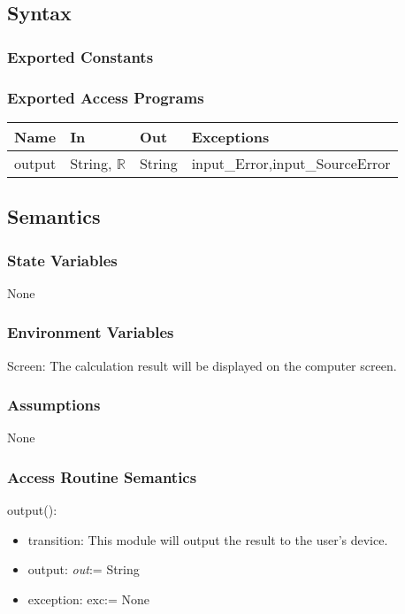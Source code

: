 \documentclass[12pt, titlepage]{article}
\begin{document}
\subsection{Syntax}

\subsubsection{Exported Constants}

\subsubsection{Exported Access Programs}

\begin{center}
\begin{tabular}{p{2cm} p{2cm} p{2cm} p{5cm}}
\hline
\textbf{Name} & \textbf{In} & \textbf{Out} & \textbf{Exceptions} \\
\hline
output & String, $\mathbb{R}$ & String & input\_Error,input\_SourceError\\
\hline
\end{tabular}
\end{center}

\subsection{Semantics}

\subsubsection{State Variables}

None
\subsubsection{Environment Variables}

Screen: The calculation result will be displayed on the computer screen.

\subsubsection{Assumptions}

None

\subsubsection{Access Routine Semantics}

output():
\begin{itemize}
\item transition: This module will output the result to the user's device.
\item output: \textit{out}:= String
\item exception: exc:= None
\end{itemize}
\newpage
\end{document}
